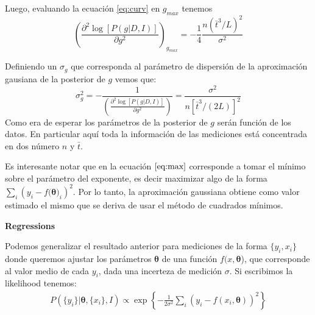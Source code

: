 \documentclass[aps,onecolumn,12pt,notitlepage]{revtex4-1}
\begin{document}
Luego, evaluando la ecuación \ref{eq:curv} en $g_{max}$ tenemos
\begin{equation}
\left(\frac{\partial^2 \log\left[P(g|D,I)\right] }{\partial g^2}\right)_{g_{max}} = -\frac{1}{4} \frac{n \left(\bar{t}^3/L\right)^2}{\sigma^2} 
\end{equation}

Definiendo un $\sigma_{g}$ que corresponda al parámetro de dispersión de la aproximación gausiana de la posterior de $g$ vemos que:
\begin{equation}
\displaystyle \sigma^{2}_{g} = -\frac{1}{\left(\frac{\partial^2 \log\left[P(g|D,I)\right] }{\partial g^2}\right)}  = \frac{\sigma^2}{n\left[\bar{t}^3/(2L)\right]^2}
\end{equation}
Como era de esperar los parámetros de la posterior de $g$ serán función de los datos. En particular aquí toda la información de las mediciones está concentrada en dos número $n$ y $\bar{t}$.


Es interesante notar que en la ecuación $\ref{eq:max}$ corresponde a tomar el mínimo sobre el parámetro del exponente, es decir maximizar algo de la forma $ \sum_{i}\left(y_{i} -f(\boldsymbol{\theta)}_{i} \right)^2$. Por lo tanto, la aproximación gaussiana obtiene como valor estimado el mismo que se deriva de usar el método de cuadrados mínimos. 

\textbf{Regressions}

Podemos generalizar el resultado anterior para mediciones de la forma $\{y_{i},x_{i}\}$ donde queremos ajustar los parámetros $\boldsymbol{\theta}$ de una función $f(x,\boldsymbol{\theta}$), que corresponde al valor medio de cada $y_{i}$, dada una incerteza de medición $\sigma$. Si escribimos la likelihood tenemos:
\begin{align}
P(\{y_{i}\}|\boldsymbol{\theta},\{x_{i}\},I) \propto \exp \left\{-\frac{1}{2\sigma^2} \sum_{i} \left(y_{i}-f(x_{i},\boldsymbol{\theta})\right)^{2}\right\}
\end{align}
\end{document}
